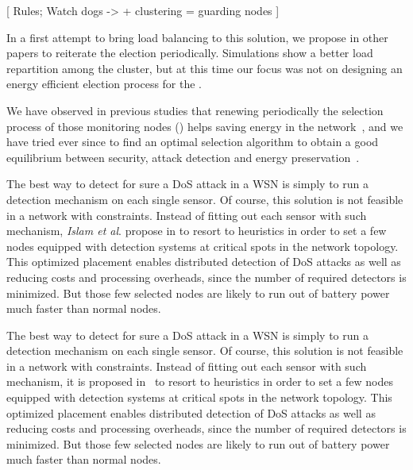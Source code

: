 [ Rules; Watch dogs -> + clustering = guarding nodes ]

In a first attempt to bring load balancing to this solution, we propose in other papers\cite{GMT12,BMM13} to reiterate the election periodically.
Simulations show a better load repartition among the cluster, but at this time our focus was not on designing an energy efficient election process for the \cns.

We have observed in previous studies that renewing periodically the selection process of those monitoring nodes (\cns) helps saving energy in the network~\cite{BMM13}, and we have tried ever since to find an optimal selection algorithm to obtain a good equilibrium between security, attack detection and energy preservation~\cite{MMB14}.


The best way to detect for sure a DoS attack in a WSN is simply to run a detection mechanism on each single sensor.
Of course, this solution is not feasible in a network with constraints.
Instead of fitting out each sensor with such mechanism, \textit{Islam et al}. propose in
\cite{INK09}
to resort to heuristics in order to set a few nodes equipped with detection systems at critical spots in the network topology.
This optimized placement enables distributed detection of DoS attacks as well as reducing costs and processing overheads, since the number of required detectors is minimized.
But those few selected nodes are likely to run out of battery power much faster than normal nodes.


The best way to detect for sure a DoS attack in a WSN is simply to run a detection mechanism on each single sensor.
Of course, this solution is not feasible in a network with constraints.
Instead of fitting out each sensor with such mechanism, it is proposed in~\cite{INK09} to resort to heuristics in order to set a few nodes equipped with detection systems at critical spots in the network topology.
This optimized placement enables distributed detection of DoS attacks as well as reducing costs and processing overheads, since the number of required detectors is minimized.
But those few selected nodes are likely to run out of battery power much faster than normal nodes.



